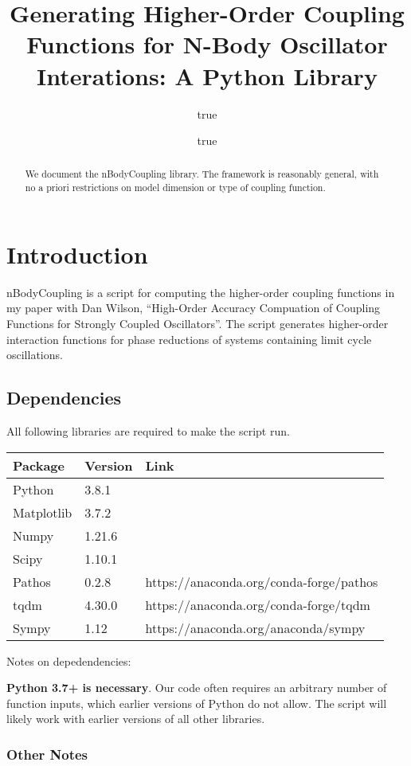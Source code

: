 \documentclass[english,a4paper,oneside]{article}
\title{Generating Higher-Order Coupling Functions for N-Body Oscillator
Interations: A Python Library}
\author{true \and true}
\date{}
\begin{document}
\maketitle
\begin{abstract}
We document the nBodyCoupling library. The framework is reasonably
general, with no a priori restrictions on model dimension or type of
coupling function.
\end{abstract}

{
\hypersetup{linkcolor=}
\setcounter{tocdepth}{4}
\tableofcontents
}
\hypertarget{introduction}{%
\section{Introduction}\label{introduction}}

nBodyCoupling is a script for computing the higher-order coupling
functions in my paper with Dan Wilson, ``High-Order Accuracy Compuation
of Coupling Functions for Strongly Coupled Oscillators''. The script
generates higher-order interaction functions for phase reductions of
systems containing limit cycle oscillations.

\hypertarget{dependencies}{%
\subsection{Dependencies}\label{dependencies}}

All following libraries are required to make the script run.

\begin{longtable}[]{@{}lll@{}}
\toprule
Package & Version & Link\tabularnewline
\midrule
\endhead
Python & 3.8.1 &\tabularnewline
Matplotlib & 3.7.2 &\tabularnewline
Numpy & 1.21.6 &\tabularnewline
Scipy & 1.10.1 &\tabularnewline
Pathos & 0.2.8 & https://anaconda.org/conda-forge/pathos\tabularnewline
tqdm & 4.30.0 & https://anaconda.org/conda-forge/tqdm\tabularnewline
Sympy & 1.12 & https://anaconda.org/anaconda/sympy\tabularnewline
\bottomrule
\end{longtable}

Notes on depedendencies:

\textbf{Python 3.7+ is necessary}. Our code often requires an arbitrary
number of function inputs, which earlier versions of Python do not
allow. The script will likely work with earlier versions of all other
libraries.

\hypertarget{other-notes}{%
\subsubsection{Other Notes}\label{other-notes}}
\end{document}
